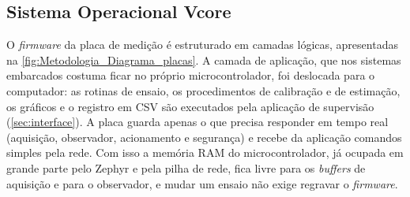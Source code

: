 \subsection{Sistema Operacional Vcore}
\label{sec:vcore}

O \textit{firmware} da placa de medição é estruturado em camadas lógicas,
apresentadas na \autoref{fig:Metodologia_Diagrama_placas}. A camada de
aplicação, que nos sistemas embarcados costuma ficar no próprio
microcontrolador, foi deslocada para o computador: as rotinas de ensaio, os
procedimentos de calibração e de estimação, os gráficos e o registro em CSV
são executados pela aplicação de supervisão (\autoref{sec:interface}). A
placa guarda apenas o que precisa responder em tempo real (aquisição,
observador, acionamento e segurança) e recebe da aplicação comandos
simples pela rede. Com isso a memória RAM do microcontrolador, já ocupada em
grande parte pelo Zephyr e pela pilha de rede, fica livre para os
\textit{buffers} de aquisição e para o observador, e mudar um ensaio não exige
regravar o \textit{firmware}.

